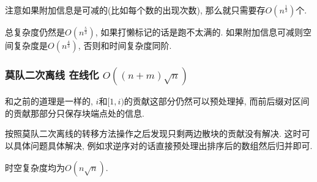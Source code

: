 注意如果附加信息是可减的(比如每个数的出现次数), 那么就只需要存$O(n^{\frac 1 3})$个.

总复杂度仍然是$O(n^{\frac 5 3})$, 如果打懒标记的话是跑不太满的. 如果附加信息可减则空间复杂度是$O(n^{\frac 4 3})$, 否则和时间复杂度同阶.

\subsubsection{莫队二次离线 在线化 $O((n + m)\sqrt n)$}

和之前的道理是一样的, $i$和$[1, i)$的贡献这部分仍然可以预处理掉, 而前后缀对区间的贡献那部分只保存块端点处的信息.

按照莫队二次离线的转移方法操作之后发现只剩两边散块的贡献没有解决. 这时可以具体问题具体解决, 例如求逆序对的话直接预处理出排序后的数组然后归并即可.

时空复杂度均为$O(n\sqrt n)$.